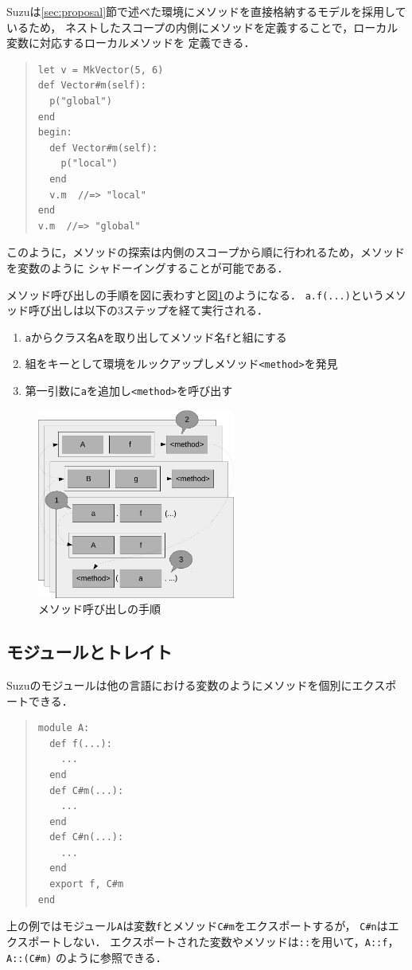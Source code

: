 \documentclass{ipsjprosym}
\begin{document}
Suzuは\ref{sec:proposal}節で述べた環境にメソッドを直接格納するモデルを採用しているため，
ネストしたスコープの内側にメソッドを定義することで，ローカル変数に対応するローカルメソッドを
定義できる．
\begin{quote}
\begin{verbatim}
let v = MkVector(5, 6)
def Vector#m(self):
  p("global")
end
begin:
  def Vector#m(self):
    p("local")
  end
  v.m  //=> "local"
end
v.m  //=> "global"
\end{verbatim}
\end{quote}
このように，メソッドの探索は内側のスコープから順に行われるため，メソッドを変数のように
シャドーイングすることが可能である．

メソッド呼び出しの手順を図に表わすと図\ref{fig:method-call}のようになる．
\verb|a.f(...)|というメソッド呼び出しは以下の3ステップを経て実行される．
\begin{enumerate}
\item \verb|a|からクラス名\verb|A|を取り出してメソッド名\verb|f|と組にする
\item 組をキーとして環境をルックアップしメソッド\verb|<method>|を発見
\item 第一引数に\verb|a|を追加し\verb|<method>|を呼び出す
\end{enumerate}

\begin{figure}
	\centering
	\includegraphics[width=6.5cm]{fig/method-call-crop.pdf}
	\caption{メソッド呼び出しの手順}
	\label{fig:method-call}
\end{figure}

\subsection{モジュールとトレイト}

Suzuのモジュールは他の言語における変数のようにメソッドを個別にエクスポートできる．
\begin{quote}
\begin{verbatim}
module A:
  def f(...):
    ...
  end
  def C#m(...):
    ...
  end
  def C#n(...):
    ...
  end
  export f, C#m
end
\end{verbatim}
\end{quote}
上の例ではモジュール\verb|A|は変数\verb|f|とメソッド\verb|C#m|をエクスポートするが，
\verb|C#n|はエクスポートしない．
エクスポートされた変数やメソッドは\verb|::|を用いて，\verb|A::f|，\verb|A::(C#m)|
のように参照できる．
\end{document}
